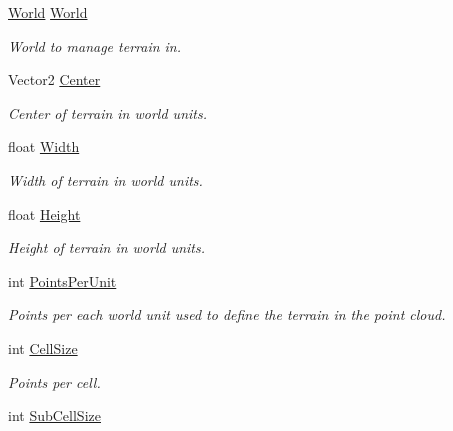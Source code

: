 \begin{DoxyCompactItemize}
\item 
\hyperlink{class_farseer_physics_1_1_dynamics_1_1_world}{World} \hyperlink{class_farseer_physics_1_1_common_1_1_texture_tools_1_1_terrain_a0ae192f42273d75c06f6212871a485ab}{World}
\begin{DoxyCompactList}\small\item\em World to manage terrain in. \end{DoxyCompactList}\item 
Vector2 \hyperlink{class_farseer_physics_1_1_common_1_1_texture_tools_1_1_terrain_a73b1f2c70f74fa407bbb27b0938bbd6c}{Center}
\begin{DoxyCompactList}\small\item\em Center of terrain in world units. \end{DoxyCompactList}\item 
float \hyperlink{class_farseer_physics_1_1_common_1_1_texture_tools_1_1_terrain_a974e47af69f91855f81c9d935dd3beba}{Width}
\begin{DoxyCompactList}\small\item\em Width of terrain in world units. \end{DoxyCompactList}\item 
float \hyperlink{class_farseer_physics_1_1_common_1_1_texture_tools_1_1_terrain_a4232983d265911c1ea4b6e243c345e07}{Height}
\begin{DoxyCompactList}\small\item\em Height of terrain in world units. \end{DoxyCompactList}\item 
int \hyperlink{class_farseer_physics_1_1_common_1_1_texture_tools_1_1_terrain_af0f133b5819c5c2bf8526fbf643654e8}{Points\+Per\+Unit}
\begin{DoxyCompactList}\small\item\em Points per each world unit used to define the terrain in the point cloud. \end{DoxyCompactList}\item 
int \hyperlink{class_farseer_physics_1_1_common_1_1_texture_tools_1_1_terrain_ad892a3a1ca7dcd9e5a3e3c996511986f}{Cell\+Size}
\begin{DoxyCompactList}\small\item\em Points per cell. \end{DoxyCompactList}\item 
int \hyperlink{class_farseer_physics_1_1_common_1_1_texture_tools_1_1_terrain_a86998ad7b5fe2aa74271d8297c990f8c}{Sub\+Cell\+Size}

\end{DoxyCompactItemize}
